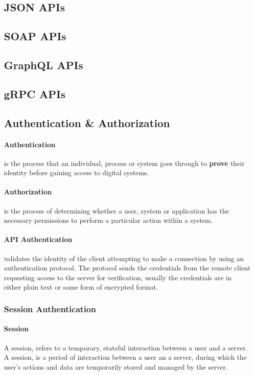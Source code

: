 \documentclass[a4paper]{article}
\begin{document}
    \subsection{JSON APIs}
    \subsection{SOAP APIs}
    \subsection{GraphQL APIs}
    \subsection{gRPC APIs}
    
    \subsection{Authentication \& Authorization}
    \paragraph*{Authentication} is the process that an individual, process or system goes through to \textbf{prove} their identity before gaining access to digital systems.

    \paragraph*{Authorization} is the process of determining whether a user, system or application has the necessary permissions to perform a particular action within a system. 

    \paragraph*{API Authentication} validates the identity of the client attempting to make a connection by using an authentication protocol. The protocol sends the credentials from the remote client requesting access to the server for verification, usually the credentials are in either plain text or some form of encrypted format.

    \subsubsection{Session Authentication} 
    
    \paragraph*{Session} A session, refers to a temporary, stateful interaction between a user and a server. 
    A session, is a period of interaction between a user an a server, during which the user's actions and data are temporarily stored and managed by the server. 
\end{document}
